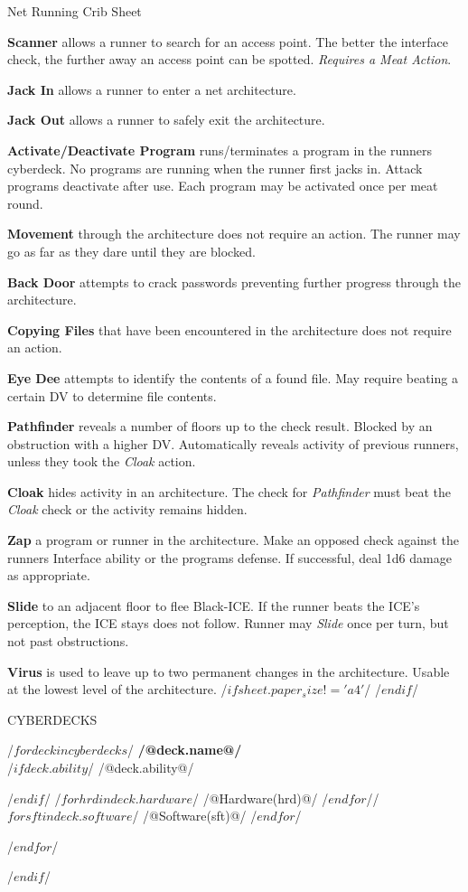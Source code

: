 \begin{multicols*}{3}
\centerline{\large Net Running Crib Sheet}
\small
\textbf{Scanner} allows a runner to search for an
access point. The better the interface check, the further away an access point
can be spotted. \textit{Requires a Meat Action}.

\textbf{Jack In} allows a runner to enter a net architecture.

\textbf{Jack Out} allows a runner to safely exit the architecture.

\textbf{Activate/Deactivate Program} runs/terminates a program 
in the runners cyberdeck. No programs are running when the runner first jacks in.
Attack programs deactivate after use. Each program may be
activated once per meat round.

\textbf{Movement} through the architecture does not require
an action. The runner may go as far as they dare until they are blocked.

\textbf{Back Door} attempts to crack passwords preventing
further progress through the architecture.

\textbf{Copying Files} that have been encountered in the architecture
does not require an action.

\textbf{Eye Dee} attempts to identify the contents of a found file.
May require beating a certain DV to determine file contents.

\textbf{Pathfinder} reveals a number of floors
up to the check result. Blocked by an obstruction with a higher DV.
Automatically reveals activity of previous runners, unless
they took the \textit{Cloak} action.

\textbf{Cloak} hides activity in an architecture. The check for \textit{Pathfinder}
must beat the \textit{Cloak} check or the activity remains hidden.

\textbf{Zap} a program or runner in the architecture. Make
an opposed check against the runners Interface ability or the programs defense.
If successful, deal 1d6 damage as appropriate.

\textbf{Slide} to an adjacent floor to flee Black-ICE.
If the runner beats the ICE's perception, the ICE stays does not follow.
Runner may \textit{Slide} once per turn, but not past obstructions.

\textbf{Virus} is used to leave up to two permanent changes in the architecture. 
Usable at the lowest level of the architecture.
/$if sheet.paper_size != 'a4'$/
\vfill\null
\columnbreak
/$endif$/

\centerline{\large CYBERDECKS}
/$ for deck in cyberdecks $/
\noindent\textbf{ /@deck.name@/ }\\
/$if deck.ability$/
/@deck.ability@/

/$endif$/
/$ for hrd in deck.hardware $/
/@Hardware(hrd)@/
/$endfor$//$ for sft in deck.software $/
/@Software(sft)@/
/$endfor$/
\hrulefill
\vspace*{6pt}

/$ endfor $/
\normalsize
\end{multicols*}
/$endif$/
